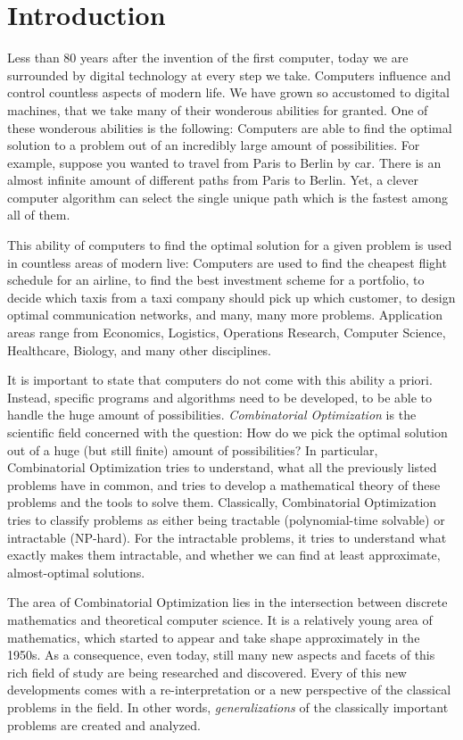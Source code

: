 \chapter{Introduction}
Less than 80 years after the invention of the first computer, today we are surrounded by digital technology at every step we take. 
Computers influence and control countless aspects of modern life. 
We have grown so accustomed to digital machines, that we take many of their wonderous abilities for granted. 
One of these wonderous abilities is the following: Computers are able to find the optimal solution to a problem out of an incredibly large amount of possibilities.
For example, suppose you wanted to travel from Paris to Berlin by car. There is an almost infinite amount of different paths from Paris to Berlin. Yet, a clever computer algorithm can select the single unique path which is the fastest among all of them.

This ability of computers to find the optimal solution for a given problem is used in countless areas of modern live: Computers are used to find the cheapest flight schedule for an airline, to find the best investment scheme for a portfolio, to decide which taxis from a taxi company should pick up which customer, to design optimal communication networks, and many, many more problems. Application areas range from Economics, Logistics, Operations Research, Computer Science, Healthcare, Biology, and many other disciplines.

It is important to state that computers do not come with this ability a priori. Instead, specific programs and algorithms need to be developed, to be able to handle the huge amount of possibilities. 
\emph{Combinatorial Optimization} is the scientific field concerned with the question: How do we pick the optimal solution out of a huge (but still finite) amount of possibilities? 
In particular, Combinatorial Optimization tries to understand, what all the previously listed problems have in common, and tries to develop a mathematical theory of these problems and the tools to solve them. Classically, Combinatorial Optimization tries to classify problems as either being tractable (polynomial-time solvable) or intractable (NP-hard). For the intractable problems, it tries to understand what exactly makes them intractable, and whether we can find at least approximate, almost-optimal solutions.

The area of Combinatorial Optimization lies in the intersection between discrete mathematics and theoretical computer science. 
It is a relatively young area of mathematics, which started to appear and take shape approximately in the 1950s. 
As a consequence, even today, still many new aspects and facets of this rich field of study are being researched and discovered. Every of this new developments comes with a re-interpretation or a new perspective of the classical problems in the field. In other words, \emph{generalizations} of the classically important problems are created and analyzed.

